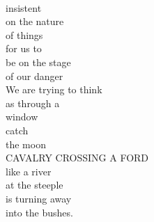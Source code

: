 \documentclass[smalldemyvopaper,11pt,twoside,onecolumn,openright,extrafontsizes]{memoir}
\begin{document}
\\insistent
\\on the nature
\\of things
\\for us to
\\be on the stage
\\of our danger
\\We are trying to think
\\as through a
\\window
\\catch
\\the moon
\\CAVALRY CROSSING A FORD
\\like a river
\\at the steeple
\\is turning away
\\into the bushes.
\end{document}

